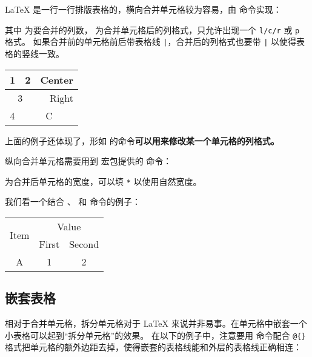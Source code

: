 \LaTeX{} 是一行一行排版表格的，横向合并单元格较为容易，由  命令实现：
\begin{command}
\end{command}
其中  为要合并的列数， 为合并单元格后的列格式，只允许出现一个 \texttt{l/c/r} 或 \texttt{p} 格式。
如果合并前的单元格前后带表格线 \texttt|，合并后的列格式也要带 \texttt| 以使得表格的竖线一致。
\begin{example}
\begin{tabular}{|c|c|c|}
  \hline
  1 & 2 & Center \\ \hline
  \multicolumn{2}{|c|}{3} &
  \multicolumn{1}{r|}{Right} \\ \hline
  4 & \multicolumn{2}{c|}{C} \\ \hline
\end{tabular}
\end{example}

上面的例子还体现了，形如  的命令\textbf{可以用来修改某一个单元格的列格式。}

纵向合并单元格需要用到  宏包提供的  命令：
\begin{command}
\end{command}
 为合并后单元格的宽度，可以填 \texttt{*} 以使用自然宽度。

我们看一个结合 、 和  命令的例子：
\begin{example}
\begin{tabular}{ccc}
  \hline
  \multirow{2}{*}{Item} &
    \multicolumn{2}{c}{Value} \\
  \cline{2-3}
    & First & Second \\ \hline
  A & 1     & 2 \\ \hline
\end{tabular}
\end{example}

\subsection{嵌套表格}\label{subsec:tabular-embed}

相对于合并单元格，拆分单元格对于 \LaTeX{} 来说并非易事。在单元格中嵌套一个小表格可以起到“拆分单元格”的效果。
在以下的例子中，注意要用  命令配合 \texttt{@\{\}} 格式把单元格的额外边距去掉，使得嵌套的表格线能和外层的表格线正确相连：

